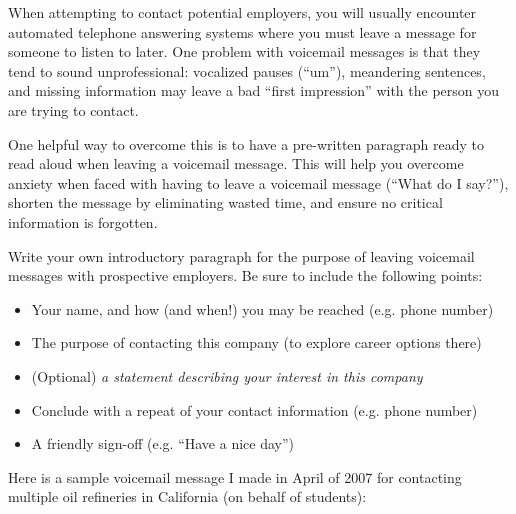

When attempting to contact potential employers, you will usually encounter automated telephone answering systems where you must leave a message for someone to listen to later.  One problem with voicemail messages is that they tend to sound unprofessional: vocalized pauses (``um''), meandering sentences, and missing information may leave a bad ``first impression'' with the person you are trying to contact.

One helpful way to overcome this is to have a pre-written paragraph ready to read aloud when leaving a voicemail message.  This will help you overcome anxiety when faced with having to leave a voicemail message (``What do I say?''), shorten the message by eliminating wasted time, and ensure no critical information is forgotten.

Write your own introductory paragraph for the purpose of leaving voicemail messages with prospective employers.  Be sure to include the following points:

\begin{itemize}
\item{} Your name, and how (and when!) you may be reached (e.g. phone number)
\item{} The purpose of contacting this company (to explore career options there)
\item{} (Optional) {\it a statement describing your interest in this company}
\item{} Conclude with a repeat of your contact information (e.g. phone number)
\item{} A friendly sign-off (e.g. ``Have a nice day'')
\end{itemize}

\vfil 

\eject






Here is a sample voicemail message I made in April of 2007 for contacting multiple oil refineries in California (on behalf of students):

